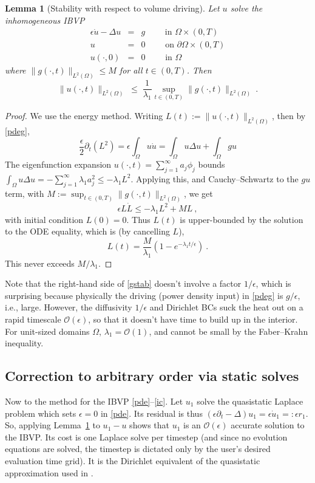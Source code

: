 \documentclass[10pt]{article}
\newcommand{\be}{\begin{equation}}
\newcommand{\ee}{\end{equation}}
\newcommand{\bea}{\begin{eqnarray}}
\newcommand{\eea}{\end{eqnarray}}
\newcommand{\bigO}{{\mathcal O}}
\newtheorem{lem}[thm]{Lemma}
\newcommand{\pO}{{\partial\Omega}}
\newcommand{\eps}{\epsilon}
\newcommand{\dt}{\partial_t}
\newcommand{\LTO}{{L^2(\Omega)}}
\begin{document}
\begin{lem}[Stability with respect to volume driving]
  Let $u$ solve the inhomogeneous IBVP
\bea
\eps\dot{u} - \Delta u &=& g    \qquad \mbox{ in } \Omega\times (0,T)
\label{pdeg}
\\
u  &=& 0  \qquad \mbox{ on } \pO \times (0,T)
\label{bc0}
\\
u(\cdot, 0)    &=&  0 \qquad \mbox{ in } \Omega
\eea
where $\|g(\cdot,t)\|_\LTO \le M$ for all $t\in(0,T)$.
Then
\be
\|u(\cdot,t)\|_\LTO \;\le\;
\frac{1}{\lambda_1}\sup_{t\in(0,T)}\|g(\cdot,t)\|_\LTO~.
\label{gstab}
\ee
\label{l:gstab}
\end{lem}
\begin{proof}
We use the energy method.
Writing $L(t):=\|u(\cdot,t)\|_\LTO$, then by \eqref{pdeg},
$$
\frac{\eps}{2}\dt(L^2) = \eps\int_\Omega u \dot u = \int_\Omega
u\Delta u + \int_\Omega g u
$$
The eigenfunction expansion
$u(\cdot,t) = \sum_{j=1}^\infty a_j \phi_j$
bounds $\int_\Omega u\Delta u = -\sum_{j=1}^\infty \lambda_1 a_j^2
\le -\lambda_1 L^2$.
Applying this, and Cauchy--Schwartz to the $gu$ term, with $M:=\sup_{t\in(0,T)}\|g(\cdot,t)\|_\LTO$,
we get
$$
\eps L\dot L \le -\lambda_1 L^2 + ML~,
$$
with initial condition $L(0)=0$.
Thus $L(t)$ is upper-bounded by the solution to the ODE equality,
which is (by cancelling $L$),
$$
L(t) = \frac{M}{\lambda_1} (1 - e^{-\lambda_1 t / \eps})~.
$$
This never exceeds $M/\lambda_1$.
\end{proof}

Note that the right-hand side of \eqref{gstab} doesn't involve a factor $1/\eps$,
which is surprising because physically the driving
(power density input)
in \eqref{pdeg} is $g/\eps$, i.e., large.
However, the diffusivity $1/\eps$ and Dirichlet BCs suck
the heat out on a rapid timescale $\bigO(\eps)$, so that it doesn't have time to build up in the interior.
For unit-sized domains $\Omega$, $\lambda_1=\bigO(1)$, and cannot be
small by the Faber--Krahn inequality.


\subsection{Correction to arbitrary order via static solves}

Now to the method for the IBVP \eqref{pde}--\eqref{ic}.
Let $u_1$ solve the quasistatic Laplace problem which sets $\eps=0$
in \eqref{pde}.
Its residual is thus $(\eps\dt-\Delta)u_1 = \eps \dot u_1 =: \eps r_1$.
So, applying Lemma~\ref{l:gstab} to $u_1-u$
shows that $u_1$ is an $\bigO(\eps)$ accurate solution
to the IBVP.
Its cost is one Laplace solve per timestep (and since no evolution
equations are solved, the timestep is dictated only by the user's desired
evaluation time grid).
It is the Dirichlet equivalent of the quasistatic approximation
used in \cite{diegmiller18}.
\end{document}
